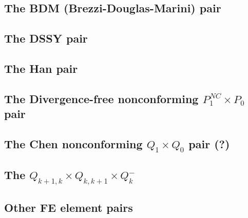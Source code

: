 \subsection{The BDM (Brezzi-Douglas-Marini) pair} \label{ss:bdm}


\subsection{The DSSY pair} \label{ss:pair_dssy2D}


\subsection{The Han pair} \label{ss:han}


\subsection{The Divergence-free nonconforming ${ P}_1^{NC}\times P_0$ pair} \label{ss:p1ncp0}


\subsection{The Chen nonconforming ${ Q}_1\times Q_0$ pair (?)} \label{ss:chenq0}


\subsection{The $Q_{k+1,k}\times Q_{k,k+1} \times Q_{k}^-$}


\subsection{Other FE element pairs}


